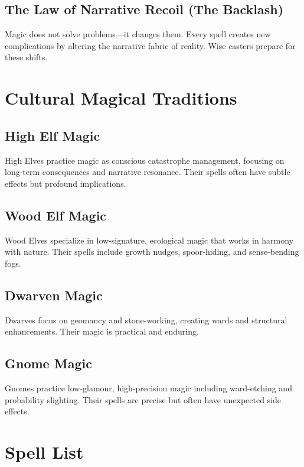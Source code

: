 \subsection{The Law of Narrative Recoil (The Backlash)}
Magic does not solve problems—it changes them. Every spell creates new complications by altering the narrative fabric of reality. Wise casters prepare for these shifts.

\section{Cultural Magical Traditions}

\subsection{High Elf Magic}
High Elves practice magic as conscious catastrophe management, focusing on long-term consequences and narrative resonance. Their spells often have subtle effects but profound implications.

\subsection{Wood Elf Magic}
Wood Elves specialize in low-signature, ecological magic that works in harmony with nature. Their spells include growth nudges, spoor-hiding, and sense-bending fogs.

\subsection{Dwarven Magic}
Dwarves focus on geomancy and stone-working, creating wards and structural enhancements. Their magic is practical and enduring.

\subsection{Gnome Magic}
Gnomes practice low-glamour, high-precision magic including ward-etching and probability slighting. Their spells are precise but often have unexpected side effects.

\section{Spell List}

